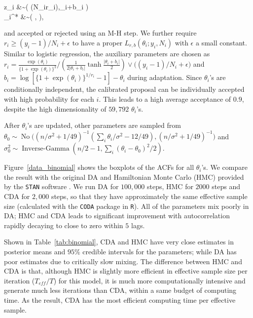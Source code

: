 \documentclass[12pt]{article}
\newcommand{\be}{\begin{equs}}
\newcommand{\ee}{\end{equs}}
\DeclareMathOperator{\No}{No}
\DeclareMathOperator{\PG}{PG}
\DeclareMathOperator{\IG}{Inverse-Gamma}
\begin{document}
\be
z_i &\sim \PG\left ( (N_ir_i),\theta_i+b_i \right)\\
\theta_i^* &\sim \No \left( , \right),
\ee
and accepted or rejected using an M-H step. We further require $r_i \ge (y_i-1)/N_i + \epsilon$ to have a proper $L_{r,b}(\theta_i;y_i, N_i)$ with $\epsilon$ a small constant. Similar to logistic regression, the auxiliary parameters are chosen as $r_i =\frac{\exp(\theta_i)}{ \{1+\exp(\theta_i)\} ^2} / \left (   \frac{1}{2 |\theta_i+b_i|} \tanh\frac{|\theta_i+b_i|}{2} \right) \vee \big ( (y_i-1)/N_i + \epsilon \big)$ and $b_i=\log[  \{1+\exp(\theta_i)\}^{1/r_i} -1] - \theta_i$ during adaptation. Since $\theta_i$'s are conditionally independent, the calibrated proposal can be individually accepted with high probability for each $i$. This leads to a high average acceptance of $0.9$, despite the high dimensionality of $59,792$ $\theta_i$'s.




After $\theta_i$'s are updated, other parameters are sampled from $\theta_0 \sim \No\big( (n/\sigma^2 +1/49)^{-1} (\sum_i \theta_i /\sigma^2  -12/49 ),  (n /\sigma^2 +1/49)^{-1} \big)$ and $\sigma^2_0 \sim \IG( n/2-1, \sum_i (\theta_i -\theta_0)^2 /2)$.

Figure~\ref{data_binomial} shows the boxplots of the ACFs for all $\theta_i$'s. We compare the result with the original DA \citep{polson2013bayesian} and Hamiltonian Monte Carlo (HMC) provided by the \texttt{STAN} software \citep{carpenter2016stan}. We run DA for $100,000$ steps, HMC for $2000$ steps and CDA for $2,000$ steps, so that they have approximately the same effective sample size (calculated with the \texttt{CODA} package in \texttt{R}). All of the parameters mix poorly in DA; HMC and CDA leads to significant improvement with autocorrelation rapidly decaying to close to zero within $5$ lags.

Shown in Table~\ref{tab:binomial}, CDA and HMC have very close estimates in posterior means and $95\%$ credible intervals for the parameters; while DA has poor estimates due to critically slow mixing. The difference between HMC and CDA is that, although HMC is slightly more efficient in effective sample size per iteration ($T_{eff}/T$) for this model, it is much more computationally intensive and generate much less iterations than CDA, within a same budget of computing time. As the result, CDA has the most efficient computing time per effective sample.
\end{document}
